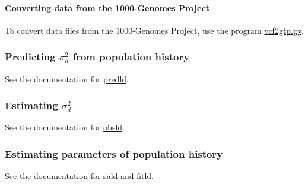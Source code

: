 \paragraph*{Converting data from the 1000-\/\-Genomes Project}

To convert data files from the 1000-\/\-Genomes Project, use the program \hyperlink{vcf2gtp_8py_vcf2gtp}{vcf2gtp.py}.

\subsubsection*{Predicting $\sigma_d^2$ from population history}

See the documentation for \hyperlink{predld_8c_predld}{predld}.

\subsubsection*{Estimating $\sigma_d^2$}

See the documentation for \hyperlink{obsld_8c_obsld}{obsld}.

\subsubsection*{Estimating parameters of population history}

See the documentation for \hyperlink{sald_8c_sald}{sald} and fitld. 